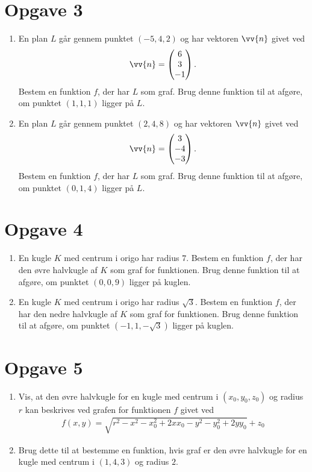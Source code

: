\section*{Opgave 3}
\begin{enumerate}[label=\roman*)]
	\item En plan $L$ går gennem punktet $(-5,4,2)$ og har vektoren $\vv{n}$ givet ved
	\begin{align*}
		\vv{n} = 
		\begin{pmatrix}
			6 \\ 3 \\ -1
		\end{pmatrix}.
	\end{align*}
	Bestem en funktion $f$, der har $L$ som graf. Brug denne funktion til at afgøre, om punktet $(1,1,1)$ ligger på $L$.
	\item En plan $L$ går gennem punktet $(2,4,8)$ og har vektoren $\vv{n}$ givet ved
	\begin{align*}
		\vv{n} = 
		\begin{pmatrix}
			3 \\ -4 \\ -3
		\end{pmatrix}.
	\end{align*}
	Bestem en funktion $f$, der har $L$ som graf. Brug denne funktion til at afgøre, om punktet $(0,1,4)$ ligger på $L$.
\end{enumerate}

\section*{Opgave 4}
\begin{enumerate}[label=\roman*)]
	\item En kugle $K$ med centrum i origo har radius $7$. Bestem en funktion $f$, der har den øvre halvkugle af $K$ som graf for funktionen. Brug denne funktion til at afgøre, 
	om punktet $(0,0,9)$ ligger på kuglen. 
	\item En kugle $K$ med centrum i origo har radius $\sqrt{3}$. Bestem en funktion $f$, der har den nedre halvkugle af $K$ som graf for funktionen. Brug denne funktion til at 
	afgøre, 	om punktet $(-1,1,-\sqrt{3})$ ligger på kuglen. 
\end{enumerate}

\section*{Opgave 5}
\begin{enumerate}[label=\roman*)]
	\item Vis, at den øvre halvkugle for en kugle med centrum i $(x_0,y_0,z_0)$ og radius $r$ kan beskrives ved grafen for funktionen $f$ givet ved
	\begin{align*}
		f(x,y) = \sqrt{r^2-x^2-x_0^2+2xx_0-y^2-y_0^2+2yy_0} +z_0
	\end{align*}
	\item Brug dette til at bestemme en funktion, hvis graf er den øvre halvkugle for en kugle med centrum i $(1,4,3)$ og radius $2$.
\end{enumerate}